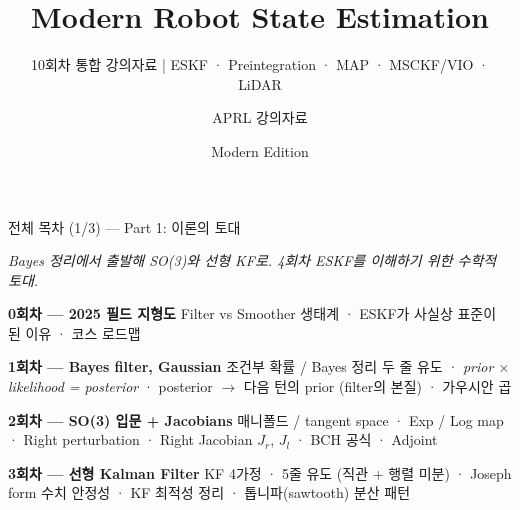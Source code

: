 ﻿

\title{Modern Robot State Estimation}
\subtitle{10회차 통합 강의자료 | ESKF · Preintegration · MAP · MSCKF/VIO · LiDAR}
\author{APRL 강의자료}
\date{Modern Edition}

\AtBeginSection[]{
  \begin{frame}
    \vspace{1.5cm}
    \begin{center}
      {\Huge \textbf{\insertsection}}
    \end{center}
  \end{frame}
}



\begin{frame}[shrink=25]\titlepage\end{frame}

\begin{frame}{전체 목차 (1/3) — Part 1: 이론의 토대}
  \begin{center}\small\itshape
    \color{gray} Bayes 정리에서 출발해 SO(3)와 선형 KF로. 4회차 ESKF를 이해하기 위한 수학적 토대.
  \end{center}
  \vspace{0.6em}
  \begin{block}{\textbf{0회차 — 2025 필드 지형도}}
    Filter vs Smoother 생태계 · ESKF가 사실상 표준이 된 이유 · 코스 로드맵
  \end{block}

  \begin{block}{\textbf{1회차 — Bayes filter, Gaussian}}
    조건부 확률 / Bayes 정리 두 줄 유도 · \emph{prior $\times$ likelihood = posterior} ·
    \alert{posterior $\to$ 다음 턴의 prior} (filter의 본질) · 가우시안 곱
  \end{block}

  \begin{block}{\textbf{2회차 — SO(3) 입문 + Jacobians}}
    매니폴드 / tangent space · Exp / Log map · Right perturbation ·
    Right Jacobian $J_r$, $J_l$ · BCH 공식 · Adjoint
  \end{block}

  \begin{block}{\textbf{3회차 — 선형 Kalman Filter}}
    KF 4가정 · 5줄 유도 (직관 + 행렬 미분) · \alert{Joseph form} 수치 안정성 ·
    KF 최적성 정리 · 톱니파(sawtooth) 분산 패턴
  \end{block}
\end{frame}

